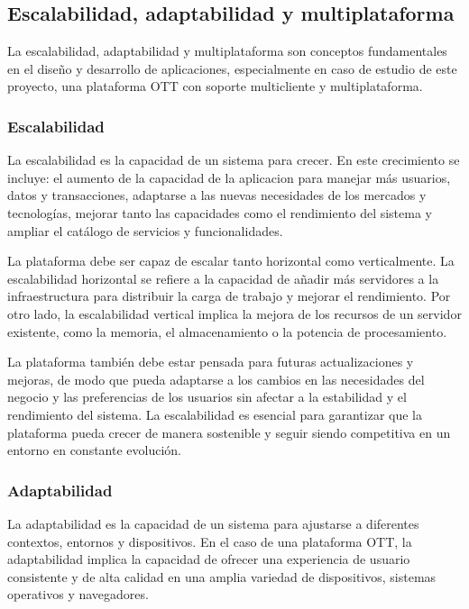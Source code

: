 \subsection{Escalabilidad, adaptabilidad y multiplataforma}
\label{sec:fundamentos_teoricos_esc_adapt}

La escalabilidad, adaptabilidad y multiplataforma son conceptos fundamentales en el diseño y desarrollo de aplicaciones, 
especialmente en caso de estudio de este proyecto, una plataforma OTT con soporte multicliente y multiplataforma.

\subsubsection{Escalabilidad}
\label{subsec:fundamentos_teoricos_esc_adapt_escalabilidad}

La escalabilidad es la capacidad de un sistema para crecer. En este crecimiento se incluye: el aumento de la capacidad de la
aplicacion para manejar más usuarios, datos y transacciones, adaptarse a las nuevas necesidades de los mercados y tecnologías,
mejorar tanto las capacidades como el rendimiento del sistema y ampliar el catálogo de servicios y funcionalidades.

La plataforma debe ser capaz de escalar tanto horizontal como verticalmente. La escalabilidad horizontal se refiere a la capacidad
de añadir más servidores a la infraestructura para distribuir la carga de trabajo y mejorar el rendimiento. Por otro lado, la escalabilidad
vertical implica la mejora de los recursos de un servidor existente, como la memoria, el almacenamiento o la potencia de procesamiento.

La plataforma también debe estar pensada para futuras actualizaciones y mejoras, de modo que pueda adaptarse a los cambios en las
necesidades del negocio y las preferencias de los usuarios sin afectar a la estabilidad y el rendimiento del sistema. La escalabilidad
es esencial para garantizar que la plataforma pueda crecer de manera sostenible y seguir siendo competitiva en un entorno en constante
evolución.

\subsubsection{Adaptabilidad}
\label{subsec:fundamentos_teoricos_esc_adapt_adaptabilidad}

La adaptabilidad es la capacidad de un sistema para ajustarse a diferentes contextos, entornos y dispositivos. En el caso de una
plataforma OTT, la adaptabilidad implica la capacidad de ofrecer una experiencia de usuario consistente y de alta calidad en una
amplia variedad de dispositivos, sistemas operativos y navegadores.

